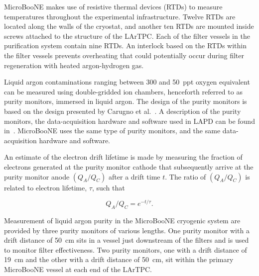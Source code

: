 MicroBooNE makes use of resistive thermal devices (RTDs) to measure temperatures throughout the experimental infrastructure. Twelve RTDs are located along the walls of the cryostat, and another ten RTDs are mounted inside screws attached to the structure of the LArTPC. Each of the filter vessels in the purification system contain nine RTDs.  An interlock based on the RTDs within the filter vessels prevents overheating that could potentially occur during filter regeneration with heated argon-hydrogen gas.

Liquid argon contaminations ranging between 300 and 50~ppt oxygen equivalent can be measured using double-gridded ion chambers, henceforth referred to as purity monitors, immersed in liquid argon. The design of the purity monitors is based on the design presented by Carugno et al.~\cite{Carugno:1990-purityMonitor}.  A description of the purity monitors, the data-acquisition hardware and software used in LAPD can be found in~\cite{Adamowski:2014-LAPD}. MicroBooNE uses the same type of purity monitors, and the same data-acquisition hardware and software. 

An estimate of the electron drift lifetime is made by measuring the fraction of electrons generated at the purity monitor cathode that subsequently arrive at the purity monitor anode $(Q_A/Q_C)$ after a drift time $t$. The ratio of $(Q_A/Q_C)$ is related to electron lifetime, $\tau$, such that

\begin{equation}
Q_A/Q_C = e^{-t/\tau}.
\end{equation}

Measurement of liquid argon purity in the MicroBooNE cryogenic system are provided by three purity monitors of various lengths. One purity monitor with a drift distance of 50~cm sits in a vessel just downstream of the filters and is used to monitor filter effectiveness. Two purity monitors, one with a drift distance of 19~cm and the other with a drift distance of 50~cm, sit within the primary MicroBooNE vessel at each end of the LArTPC.


 

